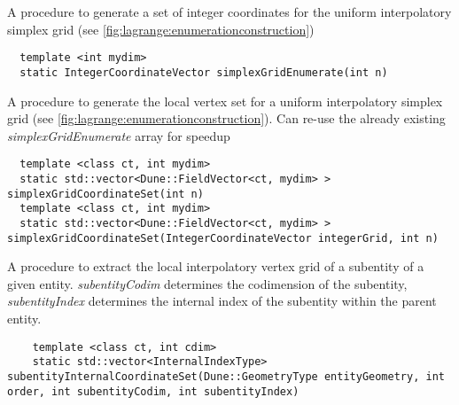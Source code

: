 \noindent
A procedure to generate a set of integer coordinates for the uniform interpolatory simplex grid (see \cref{fig:lagrange:enumerationconstruction})

\begin{mybox}
\begin{lstlisting}
  template <int mydim>
  static IntegerCoordinateVector simplexGridEnumerate(int n)
\end{lstlisting}
\end{mybox}

\noindent
A procedure to generate the local vertex set for a uniform interpolatory simplex grid (see \cref{fig:lagrange:enumerationconstruction}). Can re-use the already existing \textit{simplexGridEnumerate} array for speedup

\begin{mybox}
\begin{lstlisting}
  template <class ct, int mydim>
  static std::vector<Dune::FieldVector<ct, mydim> > simplexGridCoordinateSet(int n)
  template <class ct, int mydim>
  static std::vector<Dune::FieldVector<ct, mydim> > simplexGridCoordinateSet(IntegerCoordinateVector integerGrid, int n)
\end{lstlisting}
\end{mybox}


\noindent
A procedure to extract the local interpolatory vertex grid of a subentity of a given entity. \textit{subentityCodim} determines the codimension of the subentity, \textit{subentityIndex} determines the internal index of the subentity within the parent entity.

\begin{mybox}
\begin{lstlisting}
    template <class ct, int cdim>
    static std::vector<InternalIndexType> subentityInternalCoordinateSet(Dune::GeometryType entityGeometry, int order, int subentityCodim, int subentityIndex)
\end{lstlisting}
\end{mybox}

